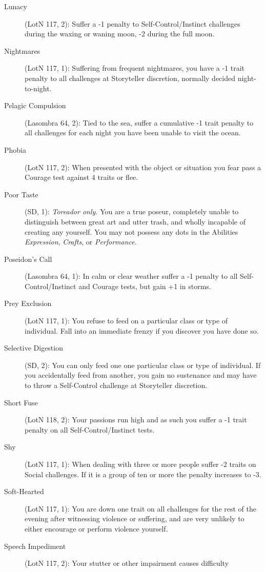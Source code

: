 \begin{description}
	\item[Lunacy] (LotN 117, 2):  Suffer a -1 penalty to Self-Control/Instinct challenges 
	during the waxing or waning moon, -2 during the full moon.
	\item[Nightmares] (LotN 117, 1):  Suffering from frequent nightmares, you have a -1 
	trait penalty to all challenges at Storyteller discretion, normally decided night-to-night.
	\item[Pelagic Compulsion] (Lasombra 64, 2):  Tied to the sea, suffer a cumulative -1 
	trait penalty to all challenges for each night you have been unable to visit the ocean.
	\item[Phobia] (LotN 117, 2):  When presented with the object or situation you fear pass 
	a Courage test against 4 traits or flee.
	\item[Poor Taste] (SD, 1):  \emph{Toreador only.}  You are a true poseur, completely unable
	to distinguish between great art and utter trash, and wholly incapable of creating any 
	yourself.  You may not possess any dots in the Abilities \emph{Expression}, \emph{Crafts}, or 
	\emph{Performance}.
	\item[Poseidon's Call] (Lasombra 64, 1):  In calm or clear weather suffer a -1 penalty to 
	all Self-Control/Instinct and Courage tests, but gain +1 in storms.
	\item[Prey Exclusion] (LotN 117, 1):  You refuse to feed on a particular class or type of 
	individual.  Fall into an immediate frenzy if you discover you have done so.
	\item[Selective Digestion] (SD, 2):  You can only feed one one particular class or type of 
	individual.  If you accidentally feed from another, you gain no sustenance and may have to 
	throw a Self-Control challenge at Storyteller discretion.
	\item[Short Fuse] (LotN 118, 2):  Your passions run high and as such you suffer a -1 
	trait penalty on all Self-Control/Instinct tests.
	\item[Shy] (LotN 117, 1):  When dealing with three or more people suffer -2 traits on 
	Social challenges.  If it is a group of ten or more the penalty increases to -3.
	\item[Soft-Hearted] (LotN 117, 1):  You are down one trait on all challenges for the rest 
	of the evening after witnessing violence or suffering, and are very unlikely to either encourage 
	or perform violence yourself.
	\item[Speech Impediment] (LotN 117, 2):  Your stutter or other impairment causes difficulty 

\end{description}
